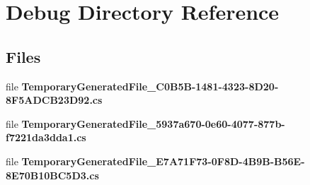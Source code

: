 \section{Debug Directory Reference}
\label{dir_a71c3b2ad23b9ff58220dd012d201987}
\subsection*{Files}
\begin{DoxyCompactItemize}
\item 
file {\bfseries Temporary\-Generated\-File\-\_\-C0\-B5\-B-\/1481-\/4323-\/8\-D20-\/8\-F5\-A\-D\-C\-B23\-D92.\-cs}
\item 
file {\bfseries Temporary\-Generated\-File\-\_\-5937a670-\/0e60-\/4077-\/877b-\/f7221da3dda1.\-cs}
\item 
file {\bfseries Temporary\-Generated\-File\-\_\-\-E7\-A71\-F73-\/0\-F8\-D-\/4\-B9\-B-\/\-B56\-E-\/8\-E70\-B10\-B\-C5\-D3.\-cs}
\end{DoxyCompactItemize}

